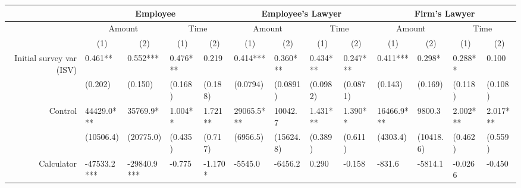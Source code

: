 \begin{tabular}{rrrrrrrrrrrrr}
\toprule
      & \multicolumn{4}{c}{Employee}  & \multicolumn{4}{c}{Employee's Lawyer} & \multicolumn{4}{c}{Firm's Lawyer} \\
\midrule
      & \multicolumn{2}{c}{Amount} & \multicolumn{2}{c}{Time} & \multicolumn{2}{c}{Amount} & \multicolumn{2}{c}{Time} & \multicolumn{2}{c}{Amount} & \multicolumn{2}{c}{Time} \\
      & \multicolumn{1}{c}{(1)} & \multicolumn{1}{c}{(2)} & \multicolumn{1}{c}{(1)} & \multicolumn{1}{c}{(2)} & \multicolumn{1}{c}{(1)} & \multicolumn{1}{c}{(2)} & \multicolumn{1}{c}{(1)} & \multicolumn{1}{c}{(2)} & \multicolumn{1}{c}{(1)} & \multicolumn{1}{c}{(2)} & \multicolumn{1}{c}{(1)} & \multicolumn{1}{c}{(2)} \\
Initial survey var (ISV) & \multicolumn{1}{l}{0.461**} & \multicolumn{1}{l}{0.552***} & \multicolumn{1}{l}{0.476***} & \multicolumn{1}{l}{0.219} & \multicolumn{1}{l}{0.414***} & \multicolumn{1}{l}{0.360***} & \multicolumn{1}{l}{0.434***} & \multicolumn{1}{l}{0.247***} & \multicolumn{1}{l}{0.411***} & \multicolumn{1}{l}{0.298*} & \multicolumn{1}{l}{0.288**} & \multicolumn{1}{l}{0.100} \\
      & \multicolumn{1}{l}{(0.202)} & \multicolumn{1}{l}{(0.150)} & \multicolumn{1}{l}{(0.168)} & \multicolumn{1}{l}{(0.188)} & \multicolumn{1}{l}{(0.0794)} & \multicolumn{1}{l}{(0.0891)} & \multicolumn{1}{l}{(0.0982)} & \multicolumn{1}{l}{(0.0871)} & \multicolumn{1}{l}{(0.143)} & \multicolumn{1}{l}{(0.169)} & \multicolumn{1}{l}{(0.118)} & \multicolumn{1}{l}{(0.108)} \\
Control & \multicolumn{1}{l}{44429.0***} & \multicolumn{1}{l}{35769.9*} & \multicolumn{1}{l}{1.004**} & \multicolumn{1}{l}{1.721**} & \multicolumn{1}{l}{29065.5***} & \multicolumn{1}{l}{10042.7} & \multicolumn{1}{l}{1.431***} & \multicolumn{1}{l}{1.390**} & \multicolumn{1}{l}{16466.9***} & \multicolumn{1}{l}{9800.3} & \multicolumn{1}{l}{2.002***} & \multicolumn{1}{l}{2.017***} \\
      & \multicolumn{1}{l}{(10506.4)} & \multicolumn{1}{l}{(20775.0)} & \multicolumn{1}{l}{(0.435)} & \multicolumn{1}{l}{(0.717)} & \multicolumn{1}{l}{(6956.5)} & \multicolumn{1}{l}{(15624.8)} & \multicolumn{1}{l}{(0.389)} & \multicolumn{1}{l}{(0.611)} & \multicolumn{1}{l}{(4303.4)} & \multicolumn{1}{l}{(10418.6)} & \multicolumn{1}{l}{(0.462)} & \multicolumn{1}{l}{(0.559)} \\
Calculator & \multicolumn{1}{l}{-47533.2***} & \multicolumn{1}{l}{-29840.9***} & \multicolumn{1}{l}{-0.775} & \multicolumn{1}{l}{-1.170*} & \multicolumn{1}{l}{-5545.0} & \multicolumn{1}{l}{-6456.2} & \multicolumn{1}{l}{0.290} & \multicolumn{1}{l}{-0.158} & \multicolumn{1}{l}{-831.6} & \multicolumn{1}{l}{-5814.1} & \multicolumn{1}{l}{-0.0266} & \multicolumn{1}{l}{-0.450} \\

\end{tabular}
